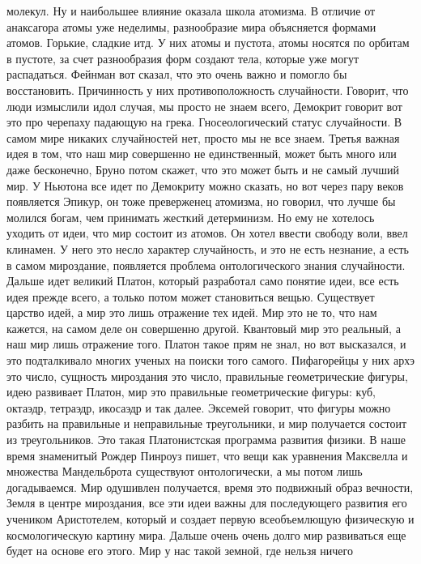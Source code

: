 \documentclass[a4paper, 12pt]{article}
\begin{document}
молекул. Ну и наибольшее влияние оказала школа атомизма. В отличие от 
анаксагора атомы уже неделимы, разнообразие мира объясняется формами 
атомов. Горькие, сладкие итд. У них атомы и пустота, атомы носятся по 
орбитам в пустоте, за счет разнообразия форм создают тела, которые уже 
могут распадаться. Фейнман вот сказал, что это очень важно и помогло бы 
восстановить. Причинность у них противоположность случайности. Говорит, 
что люди измыслили идол случая, мы просто не знаем всего, Демокрит 
говорит вот это про черепаху падающую на грека. Гносеологический статус 
случайности. В самом мире никаких случайностей нет, просто мы не все 
знаем. Третья важная идея в том, что наш мир совершенно не единственный, 
может быть много или даже бесконечно, Бруно потом скажет, что это может 
быть и не самый лучший мир. У Ньютона все идет по Демокриту можно 
сказать, но вот через пару веков появляется Эпикур, он тоже преверженец 
атомизма, но говорил, что лучше бы молился богам, чем принимать жесткий 
детерминизм. Но ему не хотелось уходить от идеи, что мир состоит из 
атомов. Он хотел ввести свободу воли, ввел клинамен. У него это несло 
характер случайность, и это не есть незнание, а есть в самом мироздание, 
появляется проблема онтологического знания случайности. Дальше идет 
великий Платон, который разработал само понятие идеи, все есть идея 
прежде всего, а только потом может становиться вещью. Существует царство 
идей, а мир это лишь отражение тех идей. Мир это не то, что нам кажется, 
на самом деле он совершенно другой. Квантовый мир это реальный, а наш 
мир лишь отражение того. Платон такое прям не знал, но вот высказался, 
и это подталкивало многих ученых на поиски того самого. Пифагорейцы 
у них архэ это число, сущность мироздания это число, правильные 
геометрические фигуры, идею развивает Платон, мир это правильные 
геометрические фигуры: куб, октаэдр, тетраэдр, икосаэдр и так далее. 
Эксемей говорит, что фигуры можно разбить на правильные и неправильные 
треугольники, и мир получается состоит из треугольников. Это такая 
Платонистская программа развития физики. В наше время знаменитый Рождер 
Пинроуз пишет, что вещи как уравнения Максвелла и множества Мандельброта 
существуют онтологически, а мы потом лишь догадываемся. Мир одушивлен 
получается, время это подвижный образ вечности, Земля в центре 
мироздания, все эти идеи важны для последующего развития его учеником 
Аристотелем, который и создает первую всеобъемлющую физическую 
и космологическую картину мира. Дальше очень очень долго мир развиваться 
еще будет на основе его этого. Мир у нас такой земной, где нельзя ничего 
\end{document}
